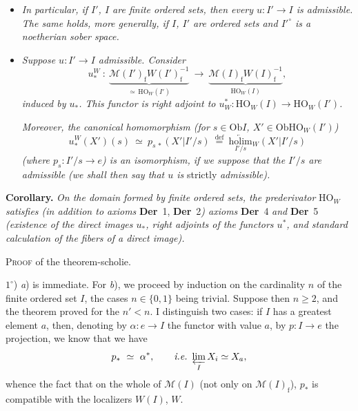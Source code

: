 \documentclass[11pt]{article}
\newcommand{\printedpage}[1]{\marginpar{\footnotesize p.~#1}}
\newcommand{\msp}[1]{\marginpar{\footnotesize [#1]}}
\newcommand{\cM}{\mathcal{M}}
\newcommand{\HO}{\mathrm{HO}}
\newcommand{\Ob}{\mathrm{Ob}}
\newcommand{\rf}{\mathrm{f}}
\begin{document}
\printedpage{34}

\begin{itemize}[leftmargin=3em]
\item[c)] \textit{In particular, if $I'$, $I$ are finite ordered sets, then every $u : I' \longrightarrow I$ is admissible. The same holds, more generally, if $I$, $I'$ are ordered sets and $I'^{\circ}$ is a noetherian sober space.}
\end{itemize}

\begin{itemize}[leftmargin=2em]
\item[2)] \textit{Suppose $u : I' \longrightarrow I$ admissible. Consider}
\[
u_*^W \ : \ \underbrace{\cM(I')_{\rf}W(I')_{\rf}^{-1}}_{\simeq\, \HO_W(I')} \ \longrightarrow \ \underbrace{\cM(I)_{\rf}W(I)_{\rf}^{-1}}_{\HO_W(I)},
\]
\textit{induced by $u_*$. This functor is right adjoint to $u_W^* : \HO_W(I) \longrightarrow \HO_W(I')$.}

\msp{page 61}
\textit{Moreover, the canonical homomorphism (for $s \in \Ob I$, $X' \in \Ob \HO_W(I')$)}
\[
u_*^W(X')(s) \ \simeq \ p_{s\,*}(X'|I'/s) \ \overset{\text{def}}{=} \ \underset{I'/s}{\underleftarrow{\mathrm{holim}}}{}_W(X'|I'/s)
\]
\textit{(where $p_s : I'/s \longrightarrow e$) is an isomorphism, if we suppose that the $I'/s$ are admissible (we shall then say that $u$ is} strictly \textit{admissible).}
\end{itemize}

\textbf{Corollary.} \textit{On the domain formed by finite ordered sets, the prederivator} $\HO_W$ \textit{satisfies (in addition to axioms} \textbf{Der}~1, \textbf{Der}~2\textit{) axioms} \textbf{Der}~4 \textit{and} \textbf{Der}~5 \textit{(existence of the direct images $u_*$, right adjoints of the functors $u^*$, and standard calculation of the fibers of a direct image).}

\textsc{Proof} of the theorem-scholie.

$1^\circ$) \textit{a}) is immediate. For \textit{b}), we proceed by induction on the cardinality $n$ of the finite ordered set $I$, the cases $n \in \{0,1\}$ being trivial. Suppose then $n \geq 2$, and the theorem proved for the $n' < n$. I distinguish two cases: if $I$ has a greatest element $a$, then, denoting by $\alpha : e \longrightarrow I$ the functor with value $a$, by $p : I \longrightarrow e$ the projection, we know that we have
\[
p_* \ \simeq \ \alpha^*, \qquad \textit{i.e.} \ \varprojlim_{I} X_i \simeq X_a,
\]
whence the fact that on the whole of $\cM(I)$
\msp{page 62}
(not only on $\cM(I)_{\rf}$), $p_*$ is compatible with the localizers $W(I)$, $W$.
\end{document}
